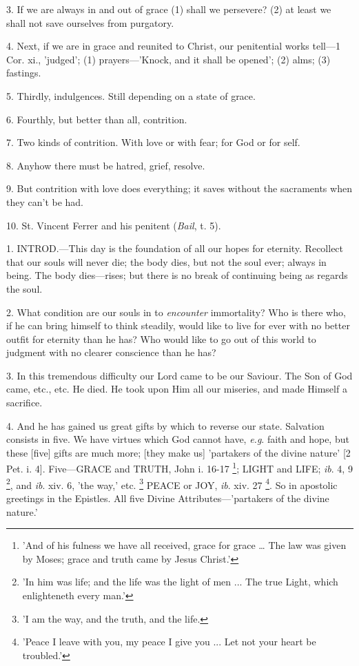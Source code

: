 3. If we are always in and out of grace (1) shall
we persevere? (2) at least we shall not save ourselves from purgatory.

4. Next, if we are in grace and reunited to
Christ, our penitential works tell—1 Cor. xi., 'judged'; (1)
prayers—'Knock, and it shall be opened'; (2) alms; (3) fastings.

5. Thirdly, indulgences. Still depending on a
state of grace.

6. Fourthly, but better than all, contrition.

7. Two kinds of contrition. With love or with
fear; for God or for self.

8. Anyhow there must be hatred, grief, resolve.

9. But contrition with love does everything; it
saves without the sacraments when they can't be had.

10. St. Vincent Ferrer and his penitent (\emph{Bail},
t. 5).


1. INTROD.—This
day is the foundation of all our hopes for eternity. Recollect that
our souls will never die; the body dies, but not the soul ever; always
in being. The body dies—rises; but there is no break of continuing
being as regards the soul.

2. What condition are our souls in to \emph{encounter}
immortality? Who is there who, if he can bring himself to think
steadily, would like to live for ever with no better outfit for
eternity than he has? Who would like to go out of this world to
judgment with no clearer conscience than he has?

3. In this tremendous difficulty our Lord came to
be our Saviour. The Son of God came, etc., etc. He died. He took upon
Him all our miseries, and made Himself a sacrifice.

4. And he has gained us great gifts by which to
reverse our state. Salvation consists in five. We have virtues
which God cannot have, \emph{e.g}. faith and hope, but these [five]
gifts are much more; [they make us] 'partakers of the divine nature'
[2 Pet. i. 4]. Five—GRACE and
TRUTH, John i. 16-17 \footnote{'And of his fulness we
have all received, grace for grace … The law was given by Moses;
grace and truth came by Jesus Christ.'}; LIGHT and LIFE;
\emph{ib}. 4, 9 \footnote{'In him was life; and
the life was the light of men ... The true Light, which enlighteneth
every man.'}, and \emph{ib}.
xiv. 6, 'the way,' etc. \footnote{'I am the way, and the
truth, and the life.}
PEACE or JOY,
\emph{ib}. xiv. 27 \footnote{'Peace I leave with you,
my peace I give you ... Let not your heart be troubled.'}. So
in apostolic greetings in the Epistles. All five Divine
Attributes—'partakers of the divine nature.'

